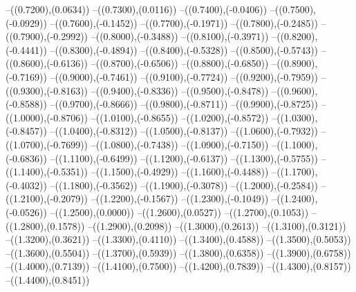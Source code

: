 {	--({\sx*(0.7200)},{\sy*(0.0634)})
	--({\sx*(0.7300)},{\sy*(0.0116)})
	--({\sx*(0.7400)},{\sy*(-0.0406)})
	--({\sx*(0.7500)},{\sy*(-0.0929)})
	--({\sx*(0.7600)},{\sy*(-0.1452)})
	--({\sx*(0.7700)},{\sy*(-0.1971)})
	--({\sx*(0.7800)},{\sy*(-0.2485)})
	--({\sx*(0.7900)},{\sy*(-0.2992)})
	--({\sx*(0.8000)},{\sy*(-0.3488)})
	--({\sx*(0.8100)},{\sy*(-0.3971)})
	--({\sx*(0.8200)},{\sy*(-0.4441)})
	--({\sx*(0.8300)},{\sy*(-0.4894)})
	--({\sx*(0.8400)},{\sy*(-0.5328)})
	--({\sx*(0.8500)},{\sy*(-0.5743)})
	--({\sx*(0.8600)},{\sy*(-0.6136)})
	--({\sx*(0.8700)},{\sy*(-0.6506)})
	--({\sx*(0.8800)},{\sy*(-0.6850)})
	--({\sx*(0.8900)},{\sy*(-0.7169)})
	--({\sx*(0.9000)},{\sy*(-0.7461)})
	--({\sx*(0.9100)},{\sy*(-0.7724)})
	--({\sx*(0.9200)},{\sy*(-0.7959)})
	--({\sx*(0.9300)},{\sy*(-0.8163)})
	--({\sx*(0.9400)},{\sy*(-0.8336)})
	--({\sx*(0.9500)},{\sy*(-0.8478)})
	--({\sx*(0.9600)},{\sy*(-0.8588)})
	--({\sx*(0.9700)},{\sy*(-0.8666)})
	--({\sx*(0.9800)},{\sy*(-0.8711)})
	--({\sx*(0.9900)},{\sy*(-0.8725)})
	--({\sx*(1.0000)},{\sy*(-0.8706)})
	--({\sx*(1.0100)},{\sy*(-0.8655)})
	--({\sx*(1.0200)},{\sy*(-0.8572)})
	--({\sx*(1.0300)},{\sy*(-0.8457)})
	--({\sx*(1.0400)},{\sy*(-0.8312)})
	--({\sx*(1.0500)},{\sy*(-0.8137)})
	--({\sx*(1.0600)},{\sy*(-0.7932)})
	--({\sx*(1.0700)},{\sy*(-0.7699)})
	--({\sx*(1.0800)},{\sy*(-0.7438)})
	--({\sx*(1.0900)},{\sy*(-0.7150)})
	--({\sx*(1.1000)},{\sy*(-0.6836)})
	--({\sx*(1.1100)},{\sy*(-0.6499)})
	--({\sx*(1.1200)},{\sy*(-0.6137)})
	--({\sx*(1.1300)},{\sy*(-0.5755)})
	--({\sx*(1.1400)},{\sy*(-0.5351)})
	--({\sx*(1.1500)},{\sy*(-0.4929)})
	--({\sx*(1.1600)},{\sy*(-0.4488)})
	--({\sx*(1.1700)},{\sy*(-0.4032)})
	--({\sx*(1.1800)},{\sy*(-0.3562)})
	--({\sx*(1.1900)},{\sy*(-0.3078)})
	--({\sx*(1.2000)},{\sy*(-0.2584)})
	--({\sx*(1.2100)},{\sy*(-0.2079)})
	--({\sx*(1.2200)},{\sy*(-0.1567)})
	--({\sx*(1.2300)},{\sy*(-0.1049)})
	--({\sx*(1.2400)},{\sy*(-0.0526)})
	--({\sx*(1.2500)},{\sy*(0.0000)})
	--({\sx*(1.2600)},{\sy*(0.0527)})
	--({\sx*(1.2700)},{\sy*(0.1053)})
	--({\sx*(1.2800)},{\sy*(0.1578)})
	--({\sx*(1.2900)},{\sy*(0.2098)})
	--({\sx*(1.3000)},{\sy*(0.2613)})
	--({\sx*(1.3100)},{\sy*(0.3121)})
	--({\sx*(1.3200)},{\sy*(0.3621)})
	--({\sx*(1.3300)},{\sy*(0.4110)})
	--({\sx*(1.3400)},{\sy*(0.4588)})
	--({\sx*(1.3500)},{\sy*(0.5053)})
	--({\sx*(1.3600)},{\sy*(0.5504)})
	--({\sx*(1.3700)},{\sy*(0.5939)})
	--({\sx*(1.3800)},{\sy*(0.6358)})
	--({\sx*(1.3900)},{\sy*(0.6758)})
	--({\sx*(1.4000)},{\sy*(0.7139)})
	--({\sx*(1.4100)},{\sy*(0.7500)})
	--({\sx*(1.4200)},{\sy*(0.7839)})
	--({\sx*(1.4300)},{\sy*(0.8157)})
	--({\sx*(1.4400)},{\sy*(0.8451)})
}
